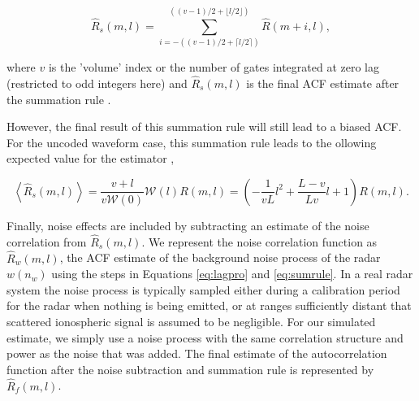 \begin{equation}
\label{eq:sumrule}
\widehat{R}_s(m,l) = \displaystyle\sum\limits_{i=-((v-1)/2+\lceil l/2 \rceil)}^{((v-1)/2+\lfloor l/2\rfloor)} \widehat{R}(m+i,l),
\end{equation}

\noindent where $v$ is the 'volume' index or the number of gates integrated at zero lag (restricted to odd integers here) and $\widehat{R}_s(m,l)$ is the final ACF estimate after the summation rule \cite{nygren1996}. 

However, the final result of this summation rule will still lead to a biased ACF. For the uncoded waveform case, this summation rule leads to the ollowing expected value for the estimator \cite{nygren1996},

\begin{equation}
\label{eq:sumruleest}
\left\langle\widehat{R}_s(m,l) \right\rangle  =\frac{v+l}{v\mathcal{W}(0)}\mathcal{W}(l)R(m,l) =\left(-\frac{1}{vL}l^2+\frac{L-v}{Lv}l+1\right)   R(m,l).
\end{equation}





Finally, noise effects are included by subtracting an estimate of the noise correlation from $\widehat{R}_s(m,l)$.  We represent the noise correlation function as $\widehat{R}_w(m,l)$, the ACF estimate of the background noise process of the radar $w(n_w)$ using the steps in Equations \ref{eq:lagpro} and \ref{eq:sumrule}. In a real radar system the noise process is typically sampled either during a calibration period for the radar when nothing is being emitted, or at ranges sufficiently distant that scattered ionospheric signal is assumed to be negligible. For our simulated estimate, we simply use a noise process with the same correlation structure and power as the noise that was added. The final estimate of the autocorrelation function after the noise subtraction and summation rule is represented by $\widehat{R}_f(m,l)$.

